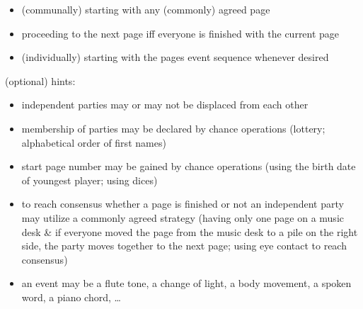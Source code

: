 \documentclass[12pt,a4paper,ngerman]{article}
\begin{document}
\begin{itemize}

    \item{(communally) starting with any (commonly) agreed page}

    \item{proceeding to the next page iff everyone is finished with the current page}

    \item{(individually) starting with the pages event sequence whenever desired}

\end{itemize}

\vspace{1.5cm}




\newpage

\begin{minipage}[b]{.7\textwidth}

\vspace{1.5cm}
\begin{footnotesize}

    {\small (optional) hints:}

    \begin{itemize}

        \item{independent parties may or may not be displaced from each other}

        \item{membership of parties may be declared by chance operations (lottery; alphabetical order of first names)}

        \item{start page number may be gained by chance operations (using the birth date of youngest player; using dices)}

        \item{
                to reach consensus whether a page is finished or not an independent party may utilize a commonly agreed strategy %
                (having only one page on a music desk \& if everyone moved the page from the music desk to a pile on the right side, the party moves together to the next page;
                using eye contact to reach consensus)
            }

        \item{an event may be a flute tone, a change of light, a body movement, a spoken word, a piano chord, \dots}

    \end{itemize}

\end{footnotesize}


\end{minipage}%




% 
% 
% 
\end{document}
